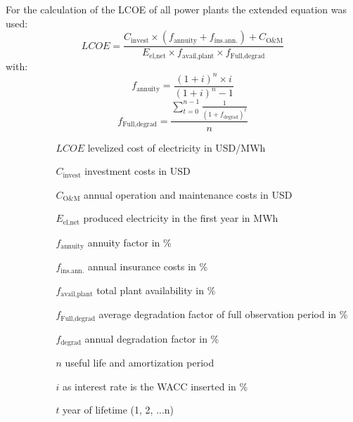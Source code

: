 For the calculation of the LCOE of all power plants the extended equation was used:
\begin{equation}
LCOE=\frac{ C_{\text{invest}} \times (f_{\text{annuity}}+f_{\text{ins.ann.}}) + C_{\text{O\&M}} }   { E_{\text{el,net}} \times f_{\text{avail,plant}} \times f_{\text{Full,degrad}} } \label{eq:LCOE}
\end{equation}
with:
\begin{equation}
f_{\text{annuity}} = \frac{(1+i)^n \times i}{(1+i)^n-1} \label{annuity}
\end{equation}
\begin{equation}
f_{\text{Full,degrad}} = \frac{\sum\limits_{t=0}^{n-1} \frac{1}{(1+f_{\text{degrad}})^{t}}}{n} \label{GL_Degradationfactor}
\end{equation} 
\begin{itemize}
\item[ ] 
\begin{itemize}
\item[ ] 
\begin{itemize}
\item[$LCOE$]levelized cost of electricity in USD/MWh
\item[$C_{\text{invest}}$]investment costs in USD
\item[$C_{\text{O\&M}}$]annual operation and maintenance costs in USD
\item[$E_{\text{el,net}}$]produced electricity in the first year in MWh
\item[$f_{\text{annuity}}$]annuity factor in \%
\item[$f_{\text{ins.ann.}}$]annual insurance costs in \%
\item[$f_{\text{avail,plant}}$]total plant availability in \%
\item[$f_{\text{Full,degrad}}$]average degradation factor of full observation period in \%
\item[$f_{\text{degrad}}$]annual degradation factor in \%
\item[$n$]useful life and amortization period
\item[$i$]as interest rate is the WACC inserted in \%
\item[$t$]year of lifetime (1, 2, ...n)
\end{itemize}
\end{itemize}
\end{itemize}
\pagebreak
